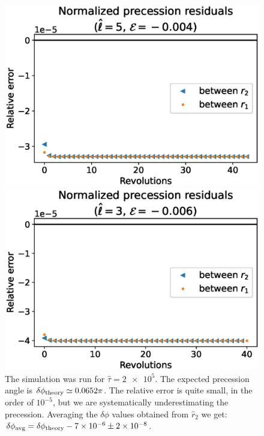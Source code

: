\begin{figure}[h]
    \begin{minipage}{0.48 \textwidth}
        \centering
        \includegraphics[width=\textwidth]{Figures/chapter2/prec1_res.eps}
        \caption{The simulation was run for $\hat \tau = \num{2e5}$.
        The expected precession angle is $\delta \phi_{\rm theory} \simeq 0.0652
        \pi$.
        The relative error is quite small, in the order of $10^{-5}$, but we are
        systematically underestimating the precession.
        Averaging the $\delta \phi$ values obtained from $\hat r_2$ we get: \\
        $\delta \phi_{\rm avg} = \delta \phi_{\rm theory} - \num{7e-6} \pm \num{2e-8}$.}
        \label{cap2:fig:prec1_res}
    \end{minipage}
    \hspace{0.015 \textwidth}
    \begin{minipage}{0.48 \textwidth}
        \centering
        \includegraphics[width=\textwidth]{Figures/chapter2/prec2_res.eps}

\end{minipage}
\end{figure}
